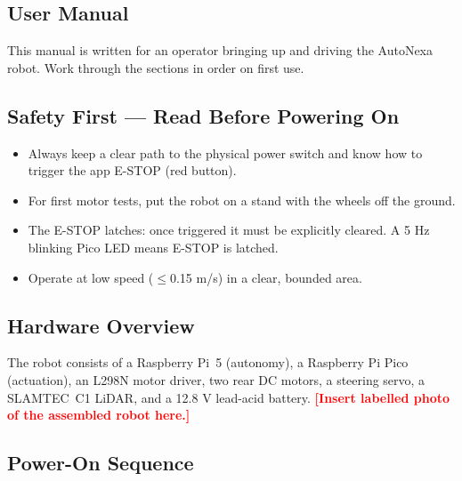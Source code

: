 \documentclass[12pt,a4paper]{report}
\newcommand{\pname}{AutoNexa}
\newcommand{\TODO}[1]{\textcolor{red}{\textbf{[#1]}}}
\begin{document}
\begin{appendices}

\chapter{User Manual}
\label{app:manual}

This manual is written for an operator bringing up and driving the \pname{}
robot. Work through the sections in order on first use.

\section{Safety First --- Read Before Powering On}

\begin{itemize}[leftmargin=1.4cm]
    \item Always keep a clear path to the physical power switch and know how to
          trigger the app E-STOP (red button).
    \item For first motor tests, put the robot on a stand with the wheels off the
          ground.
    \item The E-STOP latches: once triggered it must be explicitly cleared. A
          5 Hz blinking Pico LED means E-STOP is latched.
    \item Operate at low speed ($\leq$0.15 m/s) in a clear, bounded area.
\end{itemize}

\section{Hardware Overview}

The robot consists of a Raspberry Pi~5 (autonomy), a Raspberry Pi Pico
(actuation), an L298N motor driver, two rear DC motors, a steering servo, a
SLAMTEC~C1 LiDAR, and a 12.8 V lead-acid battery. \TODO{Insert labelled photo of
the assembled robot here.}


\section{Power-On Sequence}


\end{appendices}
\end{document}
